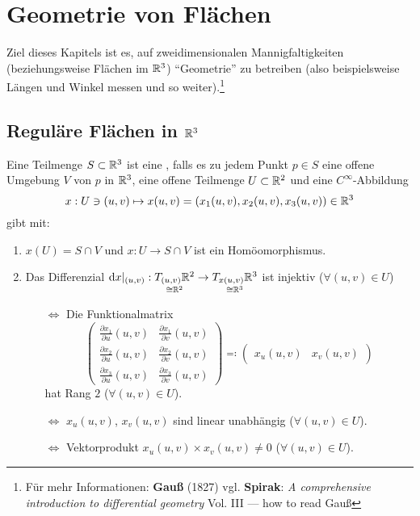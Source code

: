 \chapter{Geometrie von Flächen}

Ziel dieses Kapitels ist es, auf zweidimensionalen Mannigfaltigkeiten (beziehungsweise Flächen im $ \mathbb{R}^3 $) ``Geometrie'' zu betreiben  (also beispielsweise Längen und Winkel messen und so weiter).\footnote{Für mehr Informationen: \textbf{Gauß} (1827) vgl. \textbf{Spirak}: \emph{A comprehensive introduction to differential geometry} Vol. III --- how to read Gauß}

\section{Reguläre Flächen in $ \mathbb{R}^3 $}

\begin{remark}
  Eine Teilmenge $ S \subset \mathbb{R}^3 $ ist eine , falls es zu jedem Punkt $ p \in S $ eine offene Umgebung $ V $ von $ p $ in $ \mathbb{R}^3 $, eine offene Teilmenge $ U \subset \mathbb{R}^2 $ und eine $ C^\infty $-Abbildung
  \begin{equation*}
    x: U \ni (u,v) \mapsto x(u,v) = \left( x_1(u,v),x_2(u,v),x_3(u,v) \right) \in \mathbb{R}^3
  \end{equation*}
  gibt mit:
  \begin{enumerate}
    \item $ x(U) = S \cap V $ und $ x: U \to S \cap V $ ist ein Homöomorphismus. 
    \item Das Differenzial $ \text{d}x|_{(u,v)}: \underset{\cong \mathbb{R}^2}{T_{(u,v)}\mathbb{R}^2} \to \underset{\cong \mathbb{R}^3}{T_{x(u,v)}\mathbb{R}^3} $ ist injektiv ($ \forall (u,v) \in U $)
    \begin{itemize}
      \item[$ \Leftrightarrow $] Die Funktionalmatrix
        \begin{equation*}
          \begin{pmatrix}
            \frac{\partial x_1}{\partial u}(u,v) & \frac{\partial x_1}{\partial v}(u,v) \\
            \frac{\partial x_2}{\partial u}(u,v) & \frac{\partial x_2}{\partial v}(u,v) \\
            \frac{\partial x_3}{\partial u}(u,v) & \frac{\partial x_3}{\partial v}(u,v)
          \end{pmatrix} \eqqcolon \begin{pmatrix}
            x_u(u,v) & x_v(u,v)
          \end{pmatrix}
        \end{equation*}
        hat Rang $ 2 $ ($ \forall (u,v) \in U $).
      \item[$ \Leftrightarrow $] $ x_u(u,v) $, $ x_v(u,v) $ sind linear unabhängig ($ \forall (u,v) \in U $).
      \item[$ \Leftrightarrow $] Vektorprodukt $ x_u(u,v) \times x_v(u,v) \neq 0 $ ($ \forall (u,v) \in U $).
    \end{itemize}
  \end{enumerate}
\end{remark}

